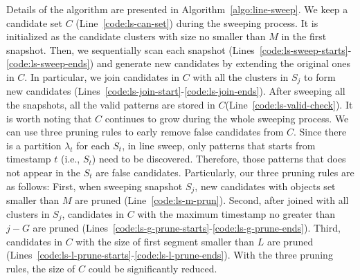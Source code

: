 Details of the algorithm are presented in Algorithm~\ref{algo:line-sweep}. We keep a candidate set $C$ (Line~\ref{code:ls-can-set}) during the sweeping process. It is initialized as the candidate clusters with size no smaller than $M$ in the first snapshot. Then, we sequentially scan each snapshot (Lines~\ref{code:ls-sweep-starts}-\ref{code:ls-sweep-ends}) and generate new candidates by extending the original ones in $C$.
In particular, we join candidates in $C$ with all the clusters in $S_j$ to form new candidates (Lines~\ref{code:ls-join-start}-\ref{code:ls-join-ends}). 
After sweeping all the snapshots, all the valid patterns are stored in $C$(Line~\ref{code:ls-valid-check}). 
It is worth noting that $C$ continues to grow during the whole sweeping process. We can use three pruning rules to 
early remove false candidates from $C$. Since there is a partition $\lambda_t$ for each $S_t$, 
in line sweep, only patterns that starts from timestamp $t$ (i.e., $S_t$) need to be discovered. Therefore, those patterns that does not appear in the $S_t$ are false candidates. Particularly, our
three pruning rules are as follows:
First, when sweeping snapshot $S_j$, new candidates with objects set smaller than $M$ are pruned (Line~\ref{code:ls-m-prun}). Second, after joined with all clusters in $S_j$, 
candidates in $C$ with the maximum timestamp no greater than $j-G$ are pruned (Lines~\ref{code:ls-g-prune-starts}-\ref{code:ls-g-prune-ends}). Third, candidates in $C$ with the size of first segment smaller than $L$
are pruned (Lines~\ref{code:ls-l-prune-starts}-\ref{code:ls-l-prune-ends}). With the three pruning rules, the size of $C$ could be significantly reduced.  


% 
%
%
%

